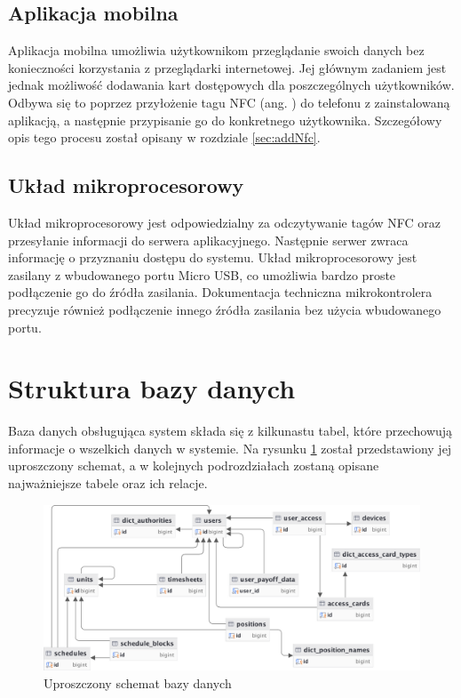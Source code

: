 \subsection{Aplikacja mobilna}

Aplikacja mobilna umożliwia użytkownikom przeglądanie swoich danych bez konieczności korzystania z przeglądarki internetowej. Jej głównym zadaniem jest jednak możliwość dodawania kart dostępowych dla poszczególnych użytkowników. Odbywa się to poprzez przyłożenie tagu NFC (ang. ) do telefonu z zainstalowaną aplikacją, a następnie przypisanie go do konkretnego użytkownika. Szczegółowy opis tego procesu został opisany w rozdziale \ref{sec:addNfc}.

\subsection{Układ mikroprocesorowy}

Układ mikroprocesorowy jest odpowiedzialny za odczytywanie tagów NFC oraz przesyłanie informacji do serwera aplikacyjnego. Następnie serwer zwraca informację o przyznaniu dostępu do systemu. Układ mikroprocesorowy jest zasilany z wbudowanego portu Micro USB, co umożliwia bardzo proste podłączenie go do źródła zasilania. Dokumentacja techniczna mikrokontrolera \cite{bib:picoWdatasheet} precyzuje również podłączenie innego źródła zasilania bez użycia wbudowanego portu.

\section{Struktura bazy danych}

Baza danych obsługująca system składa się z kilkunastu tabel, które przechowują informacje o wszelkich danych w systemie. Na rysunku \ref{fig:dbDiagram} został przedstawiony jej uproszczony schemat, a w kolejnych podrozdziałach zostaną opisane najważniejsze tabele oraz ich relacje.

\begin{figure}[H]
    \centering
    \includegraphics[width=\textwidth]{graf/dbDiagram.png}
    \caption{Uproszczony schemat bazy danych}
    \label{fig:dbDiagram}
\end{figure}


